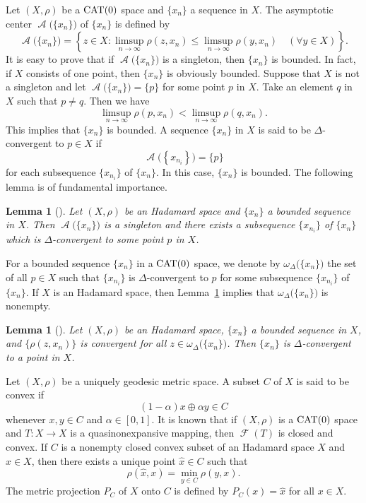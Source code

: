 \documentclass[draft]{amsart}
\numberwithin{equation}{section}
\DeclareMathOperator{\Fix}{\mathcal{F}}
\DeclareMathOperator{\AC}{\mathcal{A}}
\newcommand{\CAT}{\textup{CAT}}
\theoremstyle{plain}
\newtheorem{lemma}[theorem]{Lemma}
\theoremstyle{definition}
\theoremstyle{remark}
\begin{document}
Let $(X, \rho)$ be a $\CAT(0)$ space and 
$\{x_n\}$ a sequence in $X$. The asymptotic center 
$\AC\bigl(\{x_n\}\bigr)$ of $\{x_n\}$ is defined by 
\[
 \AC\bigl(\{x_n\}\bigr) 
 = \left\{z\in X: 
 \limsup_{n\to \infty}\rho(z, x_n)
 \leq \limsup_{n\to \infty}\rho(y, x_n) 
 \quad (\forall y\in X)\right\}. 
\]
It is easy to prove that if $\AC\bigl(\{x_n\}\bigr)$ is a  
singleton, then $\{x_n\}$ is bounded. 
In fact, if $X$ consists of one point, then 
$\{x_n\}$ is obviously bounded. 
Suppose that $X$ is not a singleton and 
let $\AC\bigl(\{x_n\}\bigr)=\{p\}$ for 
some point $p$ in $X$. 
Take an element $q$ in $X$ such that $p\neq q$. 
Then we have 
\[
 \limsup_{n\to \infty}\rho(p, x_n)
 < \limsup_{n\to \infty}\rho(q, x_n). 
\]
This implies that $\{x_n\}$ is bounded. 
A sequence $\{x_n\}$ in $X$ is said to be $\Delta$-convergent 
to $p\in X$ if 
\[
 \AC\bigl(\left\{x_{n_i}\right\}\bigr) = \{p\}
\]
for each subsequence $\{x_{n_i}\}$ of $\{x_n\}$. 
In this case, $\{x_n\}$ is bounded. 
The following lemma is of fundamental importance. 
\begin{lemma}[\cites{MR3241330, MR2416076}]\label{lem:Delta-conv-subseq-CAT0}
 Let $(X, \rho)$ be an Hadamard space and 
 $\{x_n\}$ a bounded sequence in $X$. Then 
 $\AC\bigl(\{x_n\}\bigr)$ is a singleton 
 and there exists a subsequence $\{x_{n_i}\}$ of 
 $\{x_n\}$ which is $\Delta$-convergent to some point $p$ 
 in $X$. 
\end{lemma}

For a bounded sequence $\{x_n\}$ in a $\CAT(0)$ space, 
we denote by $\omega_{\Delta}\bigl(\{x_n\}\bigr)$ 
the set of all $p\in X$ such that 
$\{x_{n_i}\}$ is $\Delta$-convergent to $p$ 
for some subsequence $\{x_{n_i}\}$ of $\{x_n\}$. 
If $X$ is an Hadamard space, then Lemma~\ref{lem:Delta-conv-subseq-CAT0} 
implies that $\omega_{\Delta}\bigl(\{x_n\}\bigr)$ is nonempty. 

\begin{lemma}[\cite{MR3574140}]\label{lem:Delta-conv-CAT0}
 Let $(X, \rho)$ be an Hadamard space, 
 $\{x_n\}$ a bounded sequence in $X$, 
 and $\{\rho(z, x_{n})\}$ is convergent 
 for all $z\in \omega_{\Delta}\bigl(\{x_n\}\bigr)$. 
 Then $\{x_n\}$ is $\Delta$-convergent to a point in $X$. 
\end{lemma}

Let $(X, \rho)$ be a uniquely geodesic metric space. 
A subset $C$ of $X$ is said to be convex if 
\[
 (1-\alpha) x \oplus \alpha y \in C
\]
whenever $x,y\in C$ and $\alpha \in [0,1]$. 
It is known that if $(X, \rho)$ is a $\CAT(0)$ space and 
$T\colon X\to X$ is a quasinonexpansive mapping, then 
$\Fix(T)$ is closed and convex. 
If $C$ is a nonempty closed convex subset of an Hadamard space $X$ 
and $x\in X$, then there exists a unique point $\hat{x}\in C$ such that 
\[
 \rho(\hat{x}, x) = \min_{y\in C} \rho(y, x). 
\] 
The metric projection $P_C$ of $X$ onto $C$ is defined by 
$P_C(x)=\hat{x}$ for all $x\in X$. 
\end{document}
